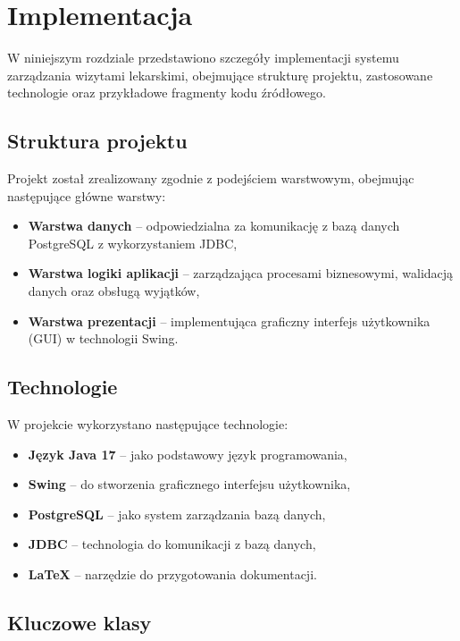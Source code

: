 \chapter{Implementacja}

W niniejszym rozdziale przedstawiono szczegóły implementacji systemu zarządzania wizytami lekarskimi, obejmujące strukturę projektu, zastosowane technologie oraz przykładowe fragmenty kodu źródłowego.

\section{Struktura projektu}

Projekt został zrealizowany zgodnie z podejściem warstwowym, obejmując następujące główne warstwy:

\begin{itemize}
\item \textbf{Warstwa danych} -- odpowiedzialna za komunikację z bazą danych PostgreSQL z wykorzystaniem JDBC,
\item \textbf{Warstwa logiki aplikacji} -- zarządzająca procesami biznesowymi, walidacją danych oraz obsługą wyjątków,
\item \textbf{Warstwa prezentacji} -- implementująca graficzny interfejs użytkownika (GUI) w technologii Swing.
\end{itemize}

\section{Technologie}

W projekcie wykorzystano następujące technologie:
\begin{itemize}
\item \textbf{Język Java 17} -- jako podstawowy język programowania,
\item \textbf{Swing} -- do stworzenia graficznego interfejsu użytkownika,
\item \textbf{PostgreSQL} -- jako system zarządzania bazą danych,
\item \textbf{JDBC} -- technologia do komunikacji z bazą danych,
\item \textbf{LaTeX} -- narzędzie do przygotowania dokumentacji.
\end{itemize}

\section{Kluczowe klasy}

